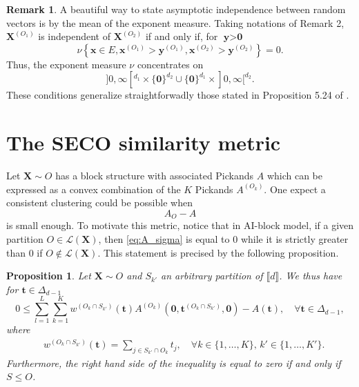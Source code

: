 \documentclass[11pt]{article}
\newtheorem{proposition}{Proposition}
\theoremstyle{definition}
\newtheorem{remark}{Remark}
\begin{document}
	\begin{remark}
		A beautiful way to state asymptotic independence between random vectors is by the mean of the exponent measure. Taking notations of Remark 2, $\textbf{X}^{(O_1)}$ is independent of $\textbf{X}^{(O_2)}$ if and only if, for $\textbf{y} > \textbf{0}$
		\begin{equation*}
			\nu \left\{ \textbf{x} \in E, \textbf{x}^{(O_1)} > \textbf{y}^{(O_1)}, \textbf{x}^{(O_2)} > \textbf{y}^{(O_2)}\right\} = 0.
		\end{equation*}
		Thus, the exponent measure $\nu$ concentrates on
		\begin{equation*}
			]0, \infty[^{d_1} \times \{\textbf{0}\}^{d_2} \cup \{ \textbf{0} \}^{d_1} \times ]0, \infty[^{d_2}.
		\end{equation*}
		These conditions generalize straightforwadly those stated in Proposition 5.24 of \cite{resnick2008extreme}.
	\end{remark}
	
	\section{The SECO similarity metric}
	\label{sec:SECO}
		Let $\textbf{X} \sim O$ has a block structure with associated Pickands $A$ which can be expressed as a convex combination of the $K$ Pickands $A^{(O_k)}$. One expect a consistent clustering could be possible when
		\begin{equation}
		\label{eq:A_sigma}
			A_{O} - A
		\end{equation}
		is small enough. To motivate this metric, notice that in AI-block model, if a given partition $O \in \mathcal{L}(\textbf{X})$, then \eqref{eq:A_sigma} is equal to $0$ while it is strictly greater than $0$ if $O \notin \mathcal{L}(\textbf{X})$. This statement is precised by the following proposition.
		
		\begin{proposition}
		\label{prop:oracle}
		Let $\textbf{X} \sim O$ and $S_{k'}$ an arbitrary partition of $\llbracket d \rrbracket$. We thus have for $\textbf{t} \in \Delta_{d-1}$
		\begin{equation}
			\label{eq:oracle}
			0 \leq \sum_{l=1}^L \sum_{k=1}^K w^{(O_k \cap S_{k'})}(\textbf{t}) A^{(O_k)}(\textbf{0},\textbf{t}^{(O_k \cap S_{k'})}, \textbf{0}) - A(\textbf{t}), \quad \forall \textbf{t} \in \Delta_{d-1},
		\end{equation}
		where
		\begin{align*}
			&w^{(O_k \cap S_{k'})}(\textbf{t}) = \sum_{j \in S_{k'} \cap O_{k}} t_j, \quad \forall k \in \{1,\dots, K \}, \, k' \in \{1,\dots, K'\}.
		\end{align*}
		Furthermore, the right hand side of the inequality is equal to zero if and only if $S \leq O$.
	\end{proposition}
	
\end{document}
